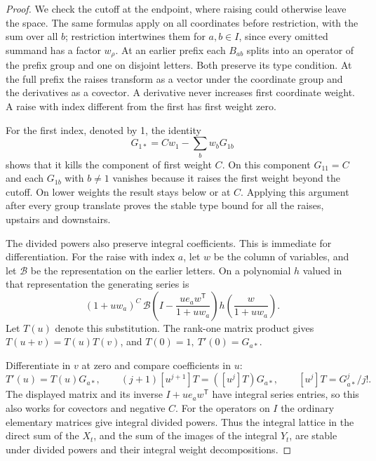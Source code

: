 \begin{proof}
We check the cutoff at the endpoint, where raising could otherwise
leave the space. The same formulas apply on all coordinates before
restriction, with the sum over all \(b\); restriction intertwines
them for \(a,b\in I\), since every omitted summand has a factor
\(w_\rho\). At an earlier prefix each \(B_{ab}\) splits into an
operator of the prefix group and one on disjoint letters.
Both preserve its type condition. At the full prefix the raises
transform as a vector under the coordinate group and the derivatives
as a covector. A derivative never increases first coordinate
weight. A raise with index different from the first has first
weight zero.

For the first index, denoted by 1, the identity
\[
                   G_{1*}=C w_1-\sum_b w_bG_{1b}
\]
shows that it kills the component of first weight \(C\).
On this component \(G_{11}=C\) and each \(G_{1b}\) with
\(b\ne1\) vanishes because it raises the first weight beyond
the cutoff. On lower weights the result stays below or at \(C\).
Applying this argument after every group translate proves the
stable type bound for all the raises, upstairs and downstairs.

The divided powers also preserve integral coefficients. This
is immediate for differentiation. For the raise with index \(a\),
let \(w\) be the column of variables, and let \(\mathcal B\)
be the representation on the earlier letters. On a polynomial
\(h\) valued in that representation the generating series is
\[
 (1+u w_a)^C\,
 \mathcal B\!\left(I-\frac{u e_a w^{\mathsf T}}{1+u w_a}\right)
                 h\!\left(\frac{w}{1+u w_a}\right).
\]
Let \(T(u)\) denote this substitution. The rank-one matrix product
gives \(T(u+v)=T(u)T(v)\), and \(T(0)=1,\ T'(0)=G_{a*}\).

Differentiate in \(v\) at zero and compare coefficients in \(u\):
\[
 T'(u)=T(u)G_{a*},\qquad
 (j+1)[u^{j+1}]T=([u^j]T)G_{a*},\qquad
 [u^j]T=G_{a*}^j/j! .
\] The displayed matrix and its inverse
\(I+u e_aw^{\mathsf T}\) have integral series entries, so this
also works for covectors and negative \(C\). For the operators on
\(I\) the ordinary elementary matrices give integral divided
powers. Thus the integral lattice in the direct sum of the \(X_t\),
and the sum of the images of the integral \(Y_t\), are stable
under divided powers and their integral weight decompositions.


\end{proof}
